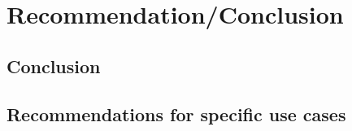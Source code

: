 
\section{Recommendation/Conclusion}


\subsection{Conclusion}


\subsection{Recommendations for specific use cases}

